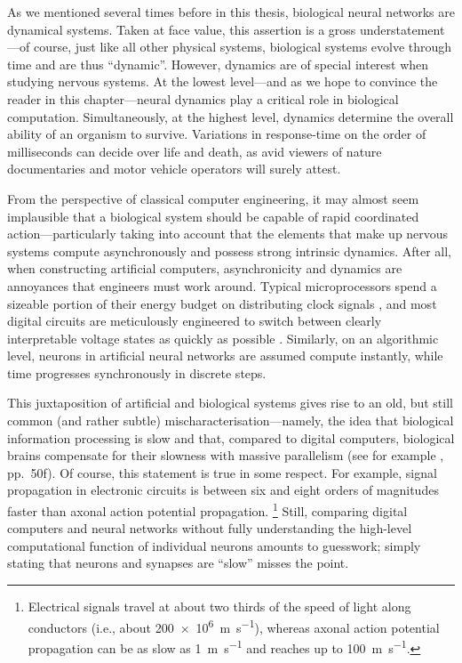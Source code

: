 
As we mentioned several times before in this thesis, biological neural networks are dynamical systems.
Taken at face value, this assertion is a gross understatement---of course, just like all other physical systems, biological systems evolve through time and are thus \enquote{dynamic}.
However, dynamics are of special interest when studying nervous systems.
At the lowest level---and as we hope to convince the reader in this chapter---neural dynamics play a critical role in biological computation.
Simultaneously, at the highest level, dynamics determine the overall ability of an organism to survive.
Variations in response-time on the order of milliseconds can decide over life and death, 
as avid viewers of nature documentaries and motor vehicle operators will surely attest.

From the perspective of classical computer engineering, it may almost seem implausible that a biological system should be capable of rapid coordinated action---particularly taking into account that the elements that make up nervous systems compute asynchronously and possess strong intrinsic dynamics.
After all, when constructing artificial computers, asynchronicity and dynamics are annoyances that engineers must work around.
Typical microprocessors spend a sizeable portion of their energy budget on distributing clock signals \citep[e.g.,][]{zhang2008injectionlocked}, and most digital circuits are meticulously engineered to switch between clearly interpretable voltage states as quickly as possible \citep[e.g.,][Chapter~4]{weste2011cmos}.
Similarly, on an algorithmic level, neurons in artificial neural networks are assumed compute instantly, while time progresses synchronously in discrete steps.

This juxtaposition of artificial and biological systems gives rise to an old, but still common (and rather subtle) mis\-cha\-rac\-te\-ri\-sa\-tion---namely, the idea that biological information processing is slow and that, compared to digital computers, biological brains compensate for their slowness with massive parallelism (see for example \cite{vonneumann1958computer}, pp.~50f).
Of course, this statement is true in some respect.
For example, signal propagation in electronic circuits is between six and eight orders of magnitudes faster than axonal action potential propagation.%
\footnote{Electrical signals travel at about two thirds of the speed of light along conductors (i.e., about \SI{200e6}{\metre\per\second}), whereas axonal action potential propagation can be as slow as \SI{1}{\metre\per\second} and reaches up to \SI{100}{\metre\per\second}.}
Still, comparing digital computers and neural networks without fully understanding the high-level computational function of individual neurons amounts to guesswork; simply stating that neurons and synapses are \enquote{slow} misses the point.

